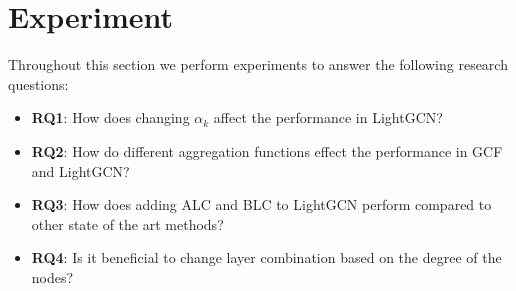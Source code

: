 \section{Experiment}
Throughout this section we perform experiments to answer the following research questions:
\begin{itemize}
    \item \textbf{RQ1}: How does changing $\alpha_k$ affect the performance in LightGCN?
    \item \textbf{RQ2}: How do different aggregation functions effect the performance in GCF and LightGCN?
    \item \textbf{RQ3}: How does adding ALC and BLC to LightGCN perform compared to other state of the art methods?
    \item \textbf{RQ4}: Is it beneficial to change layer combination based on the degree of the nodes?
\end{itemize}







